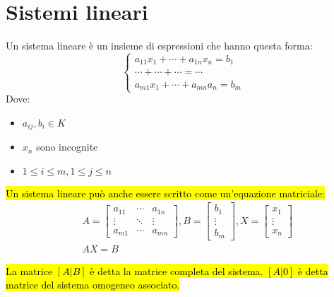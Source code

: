 \section{Sistemi lineari}
Un sistema lineare è un insieme di espressioni che hanno questa forma:
\[
    \begin{cases}
        a_{11}x_1 + \cdots + a_{1n}x_n = b_1 \\
        \cdots + \cdots + \cdots = \cdots \\
        a_{m1}x_1 + \cdots + a_{mn}a_n = b_m
    \end{cases}
\]
Dove:
\begin{itemize}
    \item $a_{ij}, b_i \in K$
    \item $x_n$ sono incognite
    \item $1 \leq i \leq m, 1 \leq j \leq n$
\end{itemize}

\hl{Un sistema lineare può anche essere scritto come un'equazione matriciale:}
\begin{align*}
    & A =
    \begin{bmatrix}
        a_{11} & \cdots & a_{1n} \\
        \vdots & \ddots & \vdots \\
        a_{m1} & \cdots & a_{mn}
    \end{bmatrix}, B =
    \begin{bmatrix}
        b_1 \\ \vdots \\ b_m
    \end{bmatrix}, X =
    \begin{bmatrix}
        x_1 \\ \vdots \\ x_n
    \end{bmatrix} \\
    & AX = B
\end{align*}

\hl{La matrice $[A|B]$ è detta la matrice completa del sistema. $[A|0]$ è detta
matrice del sistema omogeneo associato.}

